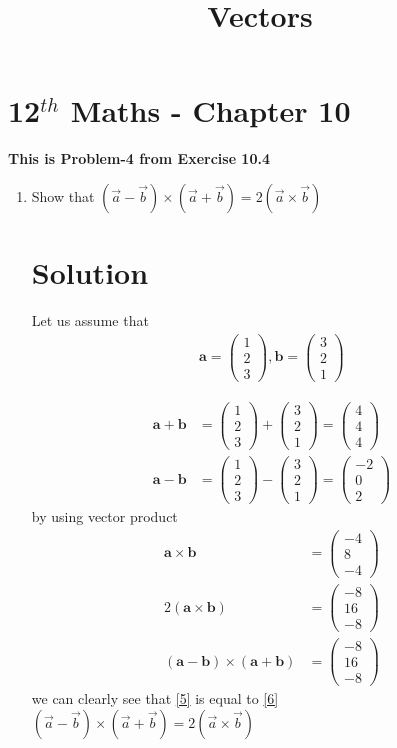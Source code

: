 \documentclass[12pt]{article}
\newcommand{\myvec}[1]{\ensuremath{\begin{pmatrix}#1\end{pmatrix}}}
\let\vec\mathbf
\begin{document}
\begin{center}
\title{\textbf{  Vectors}}
\date{\vspace{-5ex}} %
\maketitle
\end{center}
\setcounter{page}{1}
\section{12$^{th}$ Maths - Chapter 10}
\textbf{This is Problem-4 from Exercise 10.4}
\begin{enumerate}

\item Show that $(\overrightarrow{a}-\overrightarrow{b})\times(\overrightarrow{a}+\overrightarrow{b})=2(\overrightarrow{a}\times\overrightarrow{b})$ 
\section{Solution}
Let us assume that 
\begin{align}
\vec{a}=\myvec{1\\2\\3},
\vec{b}=\myvec{3\\2\\1}
\end{align}

\begin{align}
\vec{a+b}&=\myvec{1\\2\\3}+\myvec{3\\2\\1}=\myvec{4\\4\\4}\\
\vec{a-b}&=\myvec{1\\2\\3}-\myvec{3\\2\\1}=\myvec{-2\\0\\2}
\end{align}
by using vector product
\begin{align}
\vec{a \times b}&= \myvec{-4\\8\\-4}\\
2(\vec{a \times b})&= \myvec{-8\\16\\-8}\label{5}\\
(\vec{a-b}) \times (\vec{a+b})&=\myvec{-8\\16\\-8}\label{6}
\end{align}
we can clearly see that \eqref{5} is equal to \eqref{6} \\
$(\overrightarrow{a}-\overrightarrow{b})\times(\overrightarrow{a}+\overrightarrow{b})=2(\overrightarrow{a}\times\overrightarrow{b})$
\end{enumerate} 
\end{document}
